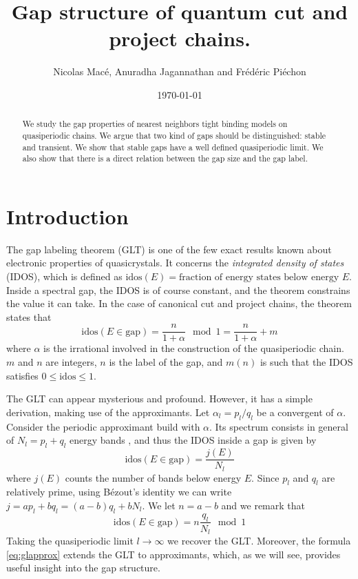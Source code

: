 \documentclass[a4paper]{jpconf}
\newcommand{\id}{\ensuremath{\text{idos}}}
\begin{document}
\title{Gap structure of quantum cut and project chains.}
\author{Nicolas Macé, Anuradha Jagannathan and Frédéric Piéchon}
\address{Laboratoire de Physique des Solides, Université Paris-Saclay, 91400 Orsay, France}


\date{\today}

\begin{abstract}
We study the gap properties of nearest neighbors tight binding models on quasiperiodic chains.
We argue that two kind of gaps should be distinguished: stable and transient.
We show that stable gaps have a well defined quasiperiodic limit. 
We also show that there is a direct relation between the gap size and the gap label.
\end{abstract}


\section*{Introduction}

The gap labeling theorem (GLT) is one of the few exact results known about electronic properties of quasicrystals.
It concerns the \emph{integrated density of states} (IDOS), which is defined as $\id(E) = \text{fraction of energy states below energy~}E$.
Inside a spectral gap, the IDOS is of course constant, and the theorem constrains the value it can take.
In the case of canonical cut and project chains, the theorem states that
\begin{equation}
\label{eq:gl}
	\id(E \in \text{gap}) = \frac{n}{1+\alpha} \mod 1 = \frac{n}{1+\alpha} + m
\end{equation}
where $\alpha$ is the irrational involved in the construction of the quasiperiodic chain. 
$m$ and $n$ are integers, $n$ is the label of the gap, and $m(n)$ is such that the IDOS satisfies $0 \leq \id \leq  1$.

The GLT can appear mysterious and profound. However, it has a simple derivation, making use of the approximants.
Let $\alpha_l = p_l/q_l$ be a convergent of $\alpha$. Consider the periodic approximant build with $\alpha$.
Its spectrum consists in general of $N_l = p_l + q_l$ energy bands \cite{diffractionLuck, codimSire}, and thus the IDOS inside a gap is given by
\begin{equation}
	\id(E \in \text{gap}) = \frac{j(E)}{N_l}
\end{equation}
where $j(E)$ counts the number of bands below energy $E$.
Since $p_l$ and $q_l$ are relatively prime, using Bézout's identity we can write $j = a p_l + b q_l = (a-b) q_l + b N_l$.
We let $n = a-b$ and we remark that
\begin{equation}
\label{eq:glapprox}
	\id(E \in \text{gap}) = n \frac{q_l}{N_l} \mod 1
\end{equation}
Taking the quasiperiodic limit $l \to \infty$ we recover the GLT.
Moreover, the formula \eqref{eq:glapprox} extends the GLT to approximants, which, as we will see, provides useful insight into the gap structure.
\end{document}
